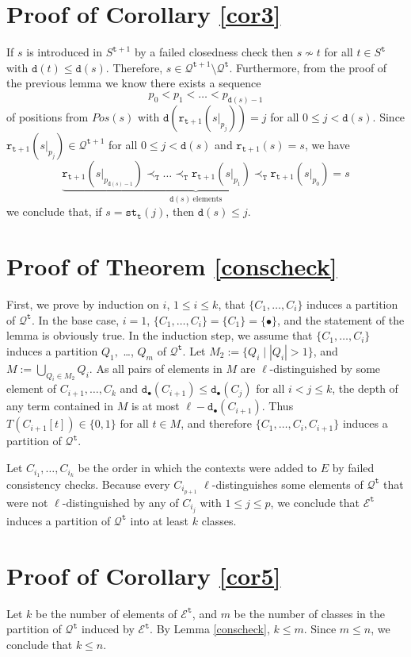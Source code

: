 \documentclass[preprint,12pt,english]{article}
\def\hole{\bullet}
\def\tr{\mathtt{r}}
\def\tty{\mathtt{st}}
\def\cE{\mathcal{E}}
\def\cQ{\mathcal{Q}}
\def\depth{\mathtt{d}}
\def\ty{\mathtt{t}}
\begin{document}
\section{Proof of Corollary \ref{cor3}}
If $s$ is introduced in $S^{\ty+1}$ by a failed closedness check then $s\nsim t$ for all $t\in S^{\ty}$ with $\depth(t)\leq\depth(s).$ Therefore, $s\in\cQ^{\ty+1}\setminus \cQ^{\ty}.$ Furthermore, from the proof of the previous lemma we know there exists a sequence $$p_0<p_1<\ldots<p_{\depth(s)-1}$$ of positions from $Pos(s)$ with $\depth(\tr_{\ty+1}(s|_{p_j}))=j$ for all $0\leq j<\depth(s).$ Since $\tr_{\ty+1}(s|_{p_j})\in\cQ^{\ty+1}$ for all $0\leq j<\depth(s)$ and $\tr_{\ty+1}(s)=s$, we have
$$\underbrace{\tr_{\ty+1}(s|_{p_{\depth(s)-1}})\prec_{\mathtt{T}}\ldots\prec_{\mathtt{T}}\tr_{\ty+1}(s|_{p_1})\prec_{\mathtt{T}}\tr_{\ty+1}(s|_{p_0})}_{\depth(s)\ \text{elements}}=s$$
 we conclude that, if $s=\tty_\ty(j)$, then $\depth(s)\leq j$. 
\section{Proof of Theorem \ref{conscheck}}
First, we prove by induction on $i$, $1\leq i\leq k$, that $\{C_1,\ldots,C_i\}$ induces a partition of $\cQ^\ty$. 
In the base case, $i=1$, $\{C_1,\ldots,C_i\}=\{C_1\}=\{\hole\}$, and the statement of the lemma is obviously true.
In the induction step, we assume that $\{C_1,\ldots,C_i\}$ induces a partition $Q_1,$ \ldots, $Q_m$ of $\cQ^\ty$.  Let $M_2:=\{Q_i\mid |Q_i| >1\}$, and $M:=\bigcup_{Q_i\in M_2}Q_i$. As all pairs of elements in $M$ are $\ell$-distinguished by some element of $C_{i+1},\ldots,C_k$ and $\depth_\hole(C_{i+1})\leq\depth_\hole(C_j)$ for all $i<j\leq k$, the depth of any term contained in $M$ is at most $\ell-\depth_\hole(C_{i+1}).$ Thus $T(C_{i+1}[t])\in\{0,1\}$ for all $t\in M$, and therefore $\{C_1,\ldots,C_i,C_{i+1}\}$ induces a partition of $\cQ^\ty$.

Let $C_{i_1},\ldots,C_{i_k}$ be the order in which the contexts were added to $E$ by failed consistency checks. Because every $C_{i_{p+1}}$ $\ell$-distinguishes some elements of $\cQ^\ty$ that were not $\ell$-distinguished by any of $C_{i_j}$ with $1\leq j\leq p$, we conclude that $\cE^\ty$ induces a partition of $\cQ^\ty$ into at least $k$ classes. 

\section{Proof of Corollary  \ref{cor5}}
 Let $k$ be the number of elements of $\cE^\ty$, and $m$ be the number of classes in the partition of $\cQ^\ty$ induced by $\cE^\ty$. By Lemma \ref{conscheck}, $k\leq m$. Since $m\leq n$,  we conclude that $k\leq n$.
\end{document}

